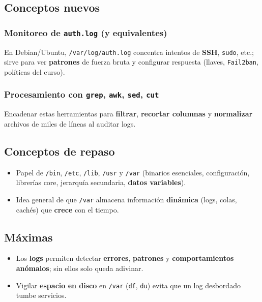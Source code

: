 \documentclass[11pt, letterpaper]{article}
\begin{document}
\subsection{Conceptos nuevos}
\label{sec:org52f272c}

\subsubsection{Monitoreo de \texttt{auth.log} (y equivalentes)}
\label{sec:org961a5c6}
En Debian/Ubuntu, \texttt{/var/log/auth.log} concentra intentos de \textbf{SSH}, \texttt{sudo}, etc.; sirve para ver \textbf{patrones} de fuerza bruta y configurar respuesta (llaves, \texttt{Fail2ban}, políticas del curso).
\subsubsection{Procesamiento con \texttt{grep}, \texttt{awk}, \texttt{sed}, \texttt{cut}}
\label{sec:org598620e}
Encadenar estas herramientas para \textbf{filtrar}, \textbf{recortar columnas} y \textbf{normalizar} archivos de miles de líneas al auditar logs.
\subsection{Conceptos de repaso}
\label{sec:orgcd36b53}

\begin{itemize}
\item Papel de \texttt{/bin}, \texttt{/etc}, \texttt{/lib}, \texttt{/usr} y \texttt{/var} (binarios esenciales, configuración, librerías core, jerarquía secundaria, \textbf{datos variables}).
\item Idea general de que \texttt{/var} almacena información \textbf{dinámica} (logs, colas, cachés) que \textbf{crece} con el tiempo.
\end{itemize}
\subsection{Máximas}
\label{sec:orga946aa9}

\begin{itemize}
\item Los \textbf{logs} permiten detectar \textbf{errores}, \textbf{patrones} y \textbf{comportamientos anómalos}; sin ellos solo queda adivinar.
\item Vigilar \textbf{espacio en disco} en \texttt{/var} (\texttt{df}, \texttt{du}) evita que un log desbordado tumbe servicios.
\end{itemize}
\end{document}
